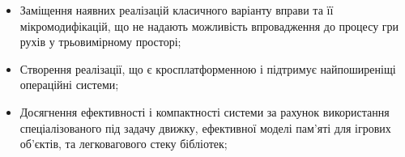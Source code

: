 \begin{itemize}
  \item Заміщення наявних реалізацій класичного варіанту вправи та її мікромодифікацій, що не надають можливість впровадження до процесу гри рухів у трьовимірному просторі;
  \item Створення реалізації, що є кросплатформенною і підтримує найпоширеніщі операційні системи;
  \item Досягнення ефективності і компактності системи за рахунок використання спеціалізованого під задачу движку, ефективної моделі пам'яті для ігрових об'єктів, та легковагового стеку бібліотек;
\end{itemize}